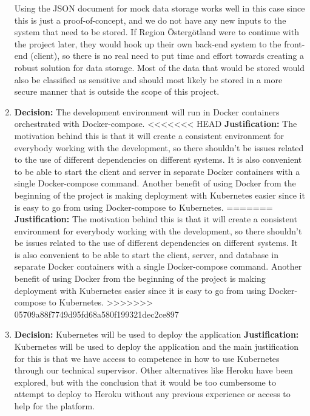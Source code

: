 \documentclass[10pt,a4paper]{article}
\begin{document}
\begin{enumerate}
    Using the JSON document for mock data storage works well in this case since this is just a proof-of-concept, and we do not have any new inputs to the system that need to be stored. If Region Östergötland were to continue with the project later, they would hook up their own back-end system to the front-end (client), so there is no real need to put time and effort towards creating a robust solution for data storage. Most of the data that would be stored would also be classified as sensitive and should most likely be stored in a more secure manner that is outside the scope of this project.

      \item \textbf{Decision:} The development environment will run in Docker containers orchestrated with Docker-compose.
    \linebreak{}
<<<<<<< HEAD
    \textbf{Justification:} The motivation behind this is that it will create a consistent environment for everybody working with the development, so there shouldn't be issues related to the use of different dependencies on different systems. It is also convenient to be able to start the client and server in separate Docker containers with a single Docker-compose command. Another benefit of using Docker from the beginning of the project is making deployment with Kubernetes easier since it is easy to go from using Docker-compose to Kubernetes.
=======
    \textbf{Justification:} The motivation behind this is that it will create a consistent environment for everybody working with the development, so there shouldn't be issues related to the use of different dependencies on different systems. It is also convenient to be able to start the client, server, and database in separate Docker containers with a single Docker-compose command. Another benefit of using Docker from the beginning of the project is making deployment with Kubernetes easier since it is easy to go from using Docker-compose to Kubernetes.
>>>>>>> 05709a88f7749d95fd68a580f199321dec2ce897
    
      \item \textbf{Decision:} Kubernetes will be used to deploy the application
    \linebreak{}
    \textbf{Justification:} Kubernetes will be used to deploy the application and the main justification for this is that we have access to competence in how to use Kubernetes through our technical supervisor. Other alternatives like Heroku have been explored, but with the conclusion that it would be too cumbersome to attempt to deploy to Heroku without any previous experience or access to help for the platform. 
    
\end{enumerate}
\end{document}
